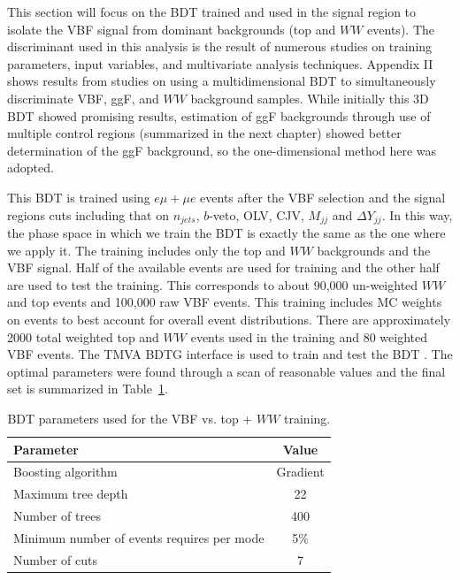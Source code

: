 This section will focus on the BDT trained and used in the signal region to isolate the VBF signal from dominant backgrounds (top and $WW$ events). The discriminant used in this analysis is the result of numerous studies on training parameters, input variables, and multivariate analysis techniques. Appendix II shows results from studies on using a multidimensional BDT to simultaneously discriminate VBF, ggF, and $WW$ background samples. While initially this 3D BDT showed promising results, estimation of ggF backgrounds through use of multiple control regions (summarized in the next chapter) showed better determination of the ggF background, so the one-dimensional method here was adopted. 

This BDT is trained using $e\mu+\mu e$ events after the VBF selection and the signal regions cuts including that on $n_{jets}$, $b$-veto, OLV, CJV, $M_{jj}$ and $\Delta Y_{jj}$. In this way, the phase space in which we train the BDT is exactly the same as the one where we apply it. The training includes only the top and $WW$ backgrounds and the VBF signal. Half of the available events are used for training and the other half are used to test the training. This corresponds to about 90,000 un-weighted $WW$ and top events and 100,000 raw VBF events. This training includes MC weights on events to best account for overall event distributions. There are approximately 2000 total weighted top and $WW$ events used in the training and 80 weighted VBF events. 
The TMVA BDTG interface is used to train and test the BDT \cite{TMVA}. The optimal parameters were found through a scan of reasonable values and the final set is summarized in Table~\ref{tab:SRBDTparameters}.
\begin{table}[h!]
\centering
\begin{tabular}{|l|c|}
\hline
Parameter                                    & Value     \\
\hline
Boosting algorithm                           &  Gradient  \\
Maximum tree depth                           &  22       \\
Number of trees                              &  400     \\
Minimum number of events requires per mode   &  5\%      \\
Number of cuts                               &  7        \\
\hline
\end{tabular}
\caption{BDT parameters used for the VBF vs. top + $WW$ training.} 
\label{tab:SRBDTparameters}
\end{table}
